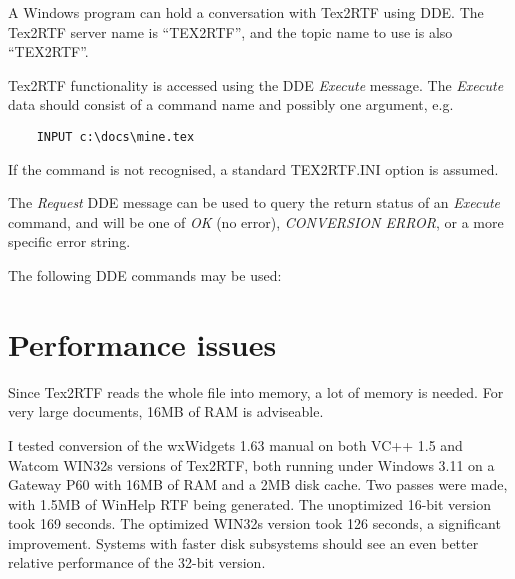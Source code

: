 A Windows program can hold a conversation with Tex2RTF using DDE. The Tex2RTF server name is
``TEX2RTF'', and the topic name to use is also ``TEX2RTF''.

Tex2RTF functionality is accessed using the DDE {\it Execute} message.
The {\it Execute} data should consist of a command name and possibly one
argument, e.g.

\begin{verbatim}
    INPUT c:\docs\mine.tex
\end{verbatim}

If the command is not recognised, a standard TEX2RTF.INI option is assumed.

The {\it Request} DDE message can be used to query the return status of an {\it Execute}
command, and will be one of {\it OK} (no error), {\it CONVERSION ERROR}, or a more
specific error string.

The following DDE commands may be used:

\begin{twocollist}
\end{twocollist}

\section{Performance issues}%

Since Tex2RTF reads the whole file into memory, a lot of memory is needed.
For very large documents, 16MB of RAM is adviseable.

I tested conversion of the wxWidgets 1.63 manual on both VC++ 1.5 and
Watcom WIN32s versions of Tex2RTF, both running under Windows 3.11 on a
Gateway P60 with 16MB of RAM and a 2MB disk cache. Two passes were
made, with 1.5MB of WinHelp RTF being generated. The unoptimized 16-bit
version took 169 seconds. The optimized WIN32s version took 126 seconds,
a significant improvement. Systems with faster disk subsystems should see
an even better relative performance of the 32-bit version.

